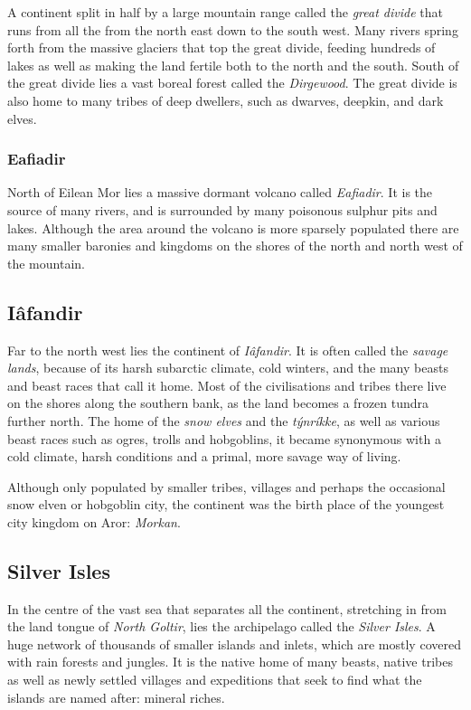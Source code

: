 A continent split in half by a large mountain range called the \emph{great
  divide} that runs from all the from the north east down to the south west.
Many rivers spring forth from the massive glaciers that top the great divide,
feeding hundreds of lakes as well as making the land fertile both to the north
and the south. South of the great divide lies a vast boreal forest called the
\emph{Dirgewood}. The great divide is also home to many tribes of deep
dwellers, such as dwarves, deepkin, and dark elves.

\subsubsection{Eafiadir}
\label{sec:Eafiadir}

North of Eilean Mor lies a massive dormant volcano called \emph{Eafiadir}. It
is the source of many rivers, and is surrounded by many poisonous sulphur pits
and lakes. Although the area around the volcano is more sparsely populated
there are many smaller baronies and kingdoms on the shores of the north and
north west of the mountain.

\subsection{Iâfandir}
\label{sec:Goltir}

Far to the north west lies the continent of \emph{Iâfandir}. It is often called
the \emph{savage lands}, because of its harsh subarctic climate, cold winters,
and the many beasts and beast races that call it home. Most of the civilisations
and tribes there live on the shores along the southern bank, as the land becomes
a frozen tundra further north. The home of the \emph{snow elves} and the
\emph{týnríkke}, as well as various beast races such as ogres, trolls and
hobgoblins, it became synonymous with a cold climate, harsh conditions and a
primal, more savage way of living.

Although only populated by smaller tribes, villages and perhaps the occasional
snow elven or hobgoblin city, the continent was the birth place of the youngest
city kingdom on Aror: \emph{Morkan}.

\subsection{Silver Isles}

In the centre of the vast sea that separates all the continent, stretching in
from the land tongue of \emph{North Goltir}, lies the archipelago called the
\emph{Silver Isles}. A huge network of thousands of smaller islands and inlets,
which are mostly covered with rain forests and jungles. It is the native home
of many beasts, native tribes as well as newly settled villages and expeditions
that seek to find what the islands are named after: mineral riches.
